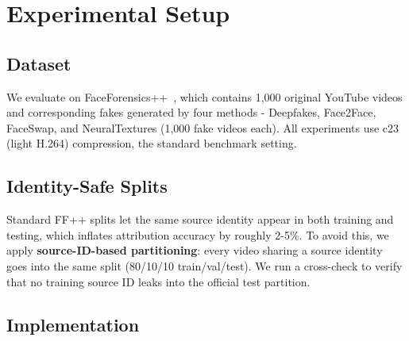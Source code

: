 \section{Experimental Setup}

\subsection{Dataset}
We evaluate on FaceForensics++~\cite{rossler2019faceforensics}, which contains 1,000 original YouTube videos and corresponding fakes generated by four methods - Deepfakes, Face2Face, FaceSwap, and NeuralTextures (1,000 fake videos each). All experiments use c23 (light H.264) compression, the standard benchmark setting.

\subsection{Identity-Safe Splits}
Standard FF++ splits let the same source identity appear in both training and testing, which inflates attribution accuracy by roughly 2-5\%. To avoid this, we apply \textbf{source-ID-based partitioning}: every video sharing a source identity goes into the same split (80/10/10 train/val/test). We run a cross-check to verify that no training source ID leaks into the official test partition.

\subsection{Implementation}


